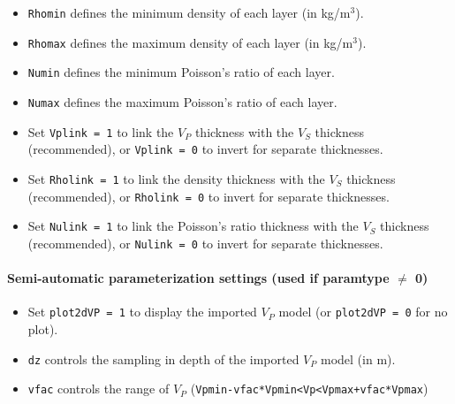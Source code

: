 \documentclass[twoside,a4paper]{article}
\begin{document}
\begin{itemize}[leftmargin=*]
\item \verb|Rhomin| defines the minimum density of each layer (in kg/m$^3$).

\item \verb|Rhomax| defines the maximum density of each layer (in kg/m$^3$).

\item \verb|Numin| defines the minimum Poisson's ratio of each layer.

\item \verb|Numax| defines the maximum Poisson's ratio of each layer.\\[2ex]

\item Set \verb|Vplink = 1| to link the $V_P$ thickness with the $V_S$ thickness (recommended), or \verb|Vplink = 0| to invert for separate thicknesses.

\item Set \verb|Rholink = 1| to link the density thickness with the $V_S$ thickness (recommended), or \verb|Rholink = 0| to invert for separate thicknesses.

\item Set \verb|Nulink = 1| to link the Poisson's ratio thickness with the $V_S$ thickness (recommended), or \verb|Nulink = 0| to invert for separate thicknesses.
\end{itemize}

\paragraph{Semi-automatic parameterization settings (used if paramtype $\neq$ 0)}
\begin{itemize}[leftmargin=*]
\setlength\itemsep{2ex}
\item Set \verb|plot2dVP = 1| to display the imported $V_P$ model (or \verb|plot2dVP = 0| for no plot).

\item \verb|dz| controls the sampling in depth of the imported $V_P$ model (in m).

\item \verb|vfac| controls the range of $V_P$ (\verb|Vpmin-vfac*Vpmin<Vp<Vpmax+vfac*Vpmax|)

\end{itemize}
\end{document}
